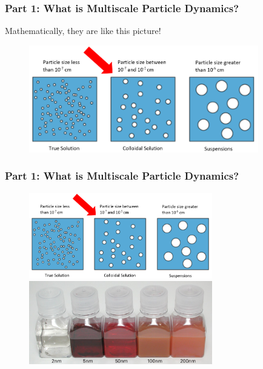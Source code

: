 \documentclass[aspectratio=169,xcolor=dvipsnames]{beamer}
\begin{document}
\begin{frame}
	\frametitle{Part 1: What is Multiscale Particle Dynamics?}
	 Mathematically, they are like this picture!
	
	\begin{figure}
		\includegraphics[width=10cm]{Particles2.png}
	\end{figure}
\end{frame}
\begin{frame}
	\frametitle{Part 1: What is Multiscale Particle Dynamics?}
	
	\begin{figure}
		\includegraphics[width=8cm]{Particles2.png}\\
		\includegraphics[width=8cm]{GoldColloids.jpg}
	\end{figure}
\end{frame}
\end{document}
